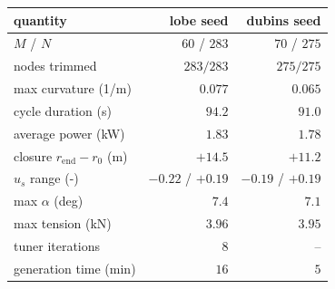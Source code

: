\begin{tabular}{lrr}
\toprule
quantity & lobe seed & dubins seed \\
\midrule
$M$ / $N$ & $60$ / $283$ & $70$ / $275$ \\
nodes trimmed & $283/283$ & $275/275$ \\
max curvature (1/m) & $0.077$ & $0.065$ \\
cycle duration (s) & $94.2$ & $91.0$ \\
average power (kW) & $1.83$ & $1.78$ \\
closure $r_\mathrm{end}-r_0$ (m) & $+14.5$ & $+11.2$ \\
$u_s$ range (-) & $-0.22$ / $+0.19$ & $-0.19$ / $+0.19$ \\
max $\alpha$ (deg) & $7.4$ & $7.1$ \\
max tension (kN) & $3.96$ & $3.95$ \\
tuner iterations & 8 & -- \\
generation time (min) & $16$ & $5$ \\
\bottomrule
\end{tabular}
